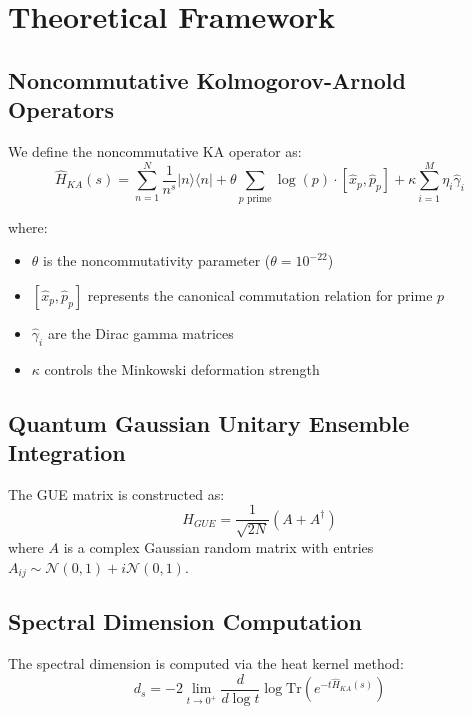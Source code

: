 \documentclass[11pt]{article}
\begin{document}
\section{Theoretical Framework}

\subsection{Noncommutative Kolmogorov-Arnold Operators}

We define the noncommutative KA operator as:
\begin{equation}
\hat{H}_{KA}(s) = \sum_{n=1}^{N} \frac{1}{n^s} |n\rangle\langle n| + \theta \sum_{p \text{ prime}} \log(p) \cdot [\hat{x}_p, \hat{p}_p] + \kappa \sum_{i=1}^{M} \eta_i \hat{\gamma}_i
\end{equation}

where:
\begin{itemize}
\item $\theta$ is the noncommutativity parameter ($\theta = 10^{-22}$)
\item $[\hat{x}_p, \hat{p}_p]$ represents the canonical commutation relation for prime $p$
\item $\hat{\gamma}_i$ are the Dirac gamma matrices
\item $\kappa$ controls the Minkowski deformation strength
\end{itemize}

\subsection{Quantum Gaussian Unitary Ensemble Integration}

The GUE matrix is constructed as:
\begin{equation}
H_{GUE} = \frac{1}{\sqrt{2N}}(A + A^\dagger)
\end{equation}
where $A$ is a complex Gaussian random matrix with entries $A_{ij} \sim \mathcal{N}(0,1) + i\mathcal{N}(0,1)$.

\subsection{Spectral Dimension Computation}

The spectral dimension is computed via the heat kernel method:
\begin{equation}
d_s = -2 \lim_{t \to 0^+} \frac{d}{d \log t} \log \text{Tr}(e^{-t\hat{H}_{KA}(s)})
\end{equation}
\end{document}
